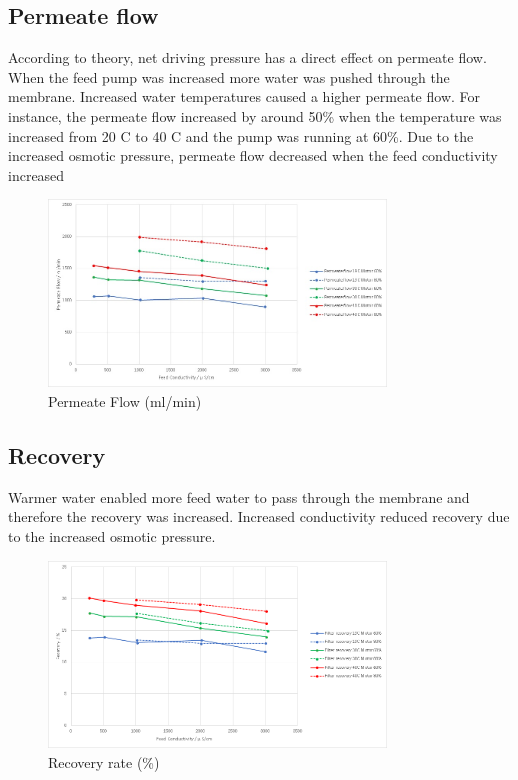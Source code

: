 \subsection{Permeate flow}

According to theory, net driving pressure has a direct effect on permeate flow. When the feed pump was increased more water was pushed through the membrane. Increased water temperatures caused a higher permeate flow. For instance, the permeate flow increased by around 50\% when the temperature was increased from 20 C to 40 C and the pump was running at 60\%. Due to the increased osmotic pressure, permeate flow decreased when the feed conductivity increased

\begin{figure}[H]
    \centering
    \includegraphics[width=0.8\textwidth]{permFlowCurrent}
    \caption{Permeate Flow (ml/min)}
    \label{fig:PermFC}
\end{figure}

\subsection{Recovery}

Warmer water enabled more feed water to pass through the membrane and therefore the recovery was increased. Increased conductivity reduced recovery due to the increased osmotic pressure.

\begin{figure}[H]
    \centering
    \includegraphics[width=0.8\textwidth]{Recovery}
    \caption{Recovery rate (\%)}
    \label{fig:rec}
\end{figure}

